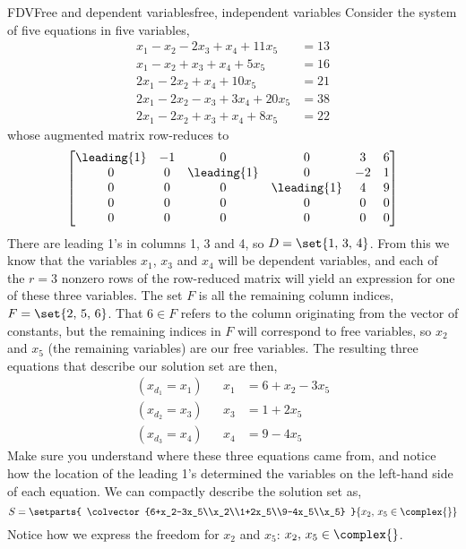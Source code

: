 \begin{example}{FDV}{Free and dependent variables}{free, independent variables}
Consider the system of five equations in five variables,
%
\begin{align*}
 x_1  - x_2  -2 x_3 +  x_4 + 11 x_5 &= 13 \\
x_1 - x_2 +  x_3+  x_4 + 5 x_5 &= 16 \\
 2 x_1  -2 x_2       +  x_4 + 10 x_5 &= 21 \\
 2 x_1  -2 x_2  - x_3 + 3 x_4 + 20 x_5 &= 38 \\
 2 x_1  -2 x_ 2 +  x_3 +  x_4 + 8 x_ 5&= 22
\end{align*}
%
whose augmented matrix row-reduces to
%
\begin{equation*}
\begin{bmatrix}
 \leading{1} & -1 & 0 & 0 & 3 & 6 \\
 0 & 0 & \leading{1} & 0 & -2 & 1 \\
 0 & 0 & 0 & \leading{1} & 4 & 9 \\
 0 & 0 & 0 & 0 & 0 & 0 \\
 0 & 0 & 0 & 0 & 0 & 0
\end{bmatrix}
\end{equation*}
%
There are leading 1's in columns 1, 3 and 4, so $D=\set{1,\,3,\,4}$.  From this we know that the variables $x_1$, $x_3$ and $x_4$ will be dependent variables, and each of the $r=3$ nonzero rows of the row-reduced matrix will yield an expression for one of these three variables.  The set $F$ is all the remaining column indices, $F=\set{2,\,5,\,6}$.  That $6\in F$ refers to the column originating from the vector of constants, but the remaining indices in $F$ will correspond to free variables, so $x_2$ and $x_5$ (the remaining variables) are our free variables.  The resulting three equations that describe our solution set are then,
%
\begin{align*}
(x_{d_1}=x_1)& & x_1&=6+x_2-3x_5\\
(x_{d_2}=x_3)& & x_3&=1+2x_5\\
(x_{d_3}=x_4)& & x_4&=9-4x_5
\end{align*}
%
Make sure you understand where these three equations came from, and notice how the location of the leading 1's determined the variables on the left-hand side of each equation.  We can compactly describe the solution set as,
%
\begin{equation*}
S=
\setparts{
\colvector{6+x_2-3x_5\\x_2\\1+2x_5\\9-4x_5\\x_5}
}{x_2,\,x_5\in\complex{\null}}
\end{equation*}
%
Notice how we express the freedom for $x_2$ and $x_5$: $x_2,\,x_5\in\complex{\null}$.
%
\end{example}
